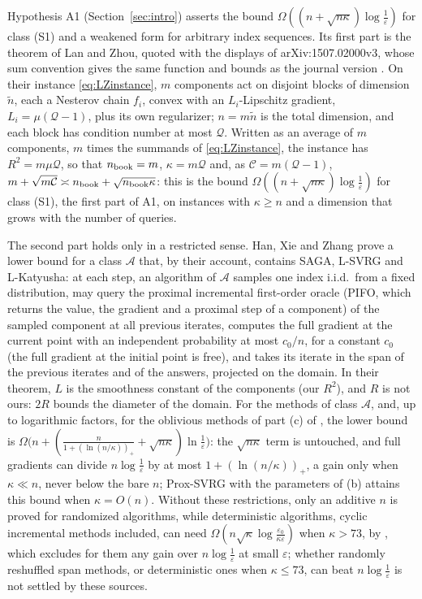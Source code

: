 Hypothesis A1 (Section~\ref{sec:intro}) asserts the bound $\Omega((n+\sqrt{n\kappa})\log\frac1\varepsilon)$ for class
(S1) and a weakened form for arbitrary index sequences. Its first part is the theorem of Lan and Zhou, quoted with the
displays of arXiv:1507.02000v3, whose sum convention gives the same function and bounds as the journal version
\cite{lan2018optimal}. On their instance \eqref{eq:LZinstance}, $m$ components act on disjoint blocks of dimension
$\tilde n$, each a Nesterov chain $f_i$, convex with an $L_i$-Lipschitz gradient, $L_i=\mu(\mathcal Q-1)$, plus its own
regularizer; $n=m\tilde n$ is the total dimension, and each block has condition number at most $\mathcal Q$.
Written as an average of $m$ components, $m$ times the summands of \eqref{eq:LZinstance}, the instance has
$R^2=m\mu\mathcal Q$, so that $n_{\rm book}=m$, $\kappa=m\mathcal Q$ and, as $\mathcal C=m(\mathcal Q-1)$,
$m+\sqrt{m\mathcal C}\asymp n_{\rm book}+\sqrt{n_{\rm book}\kappa}$: this is the bound
$\Omega((n+\sqrt{n\kappa})\log\frac1\varepsilon)$ for class (S1), the first part of A1, on instances with $\kappa\ge n$
and a dimension that grows with the number of queries.

The second part holds only in a restricted sense. Han, Xie and Zhang \cite{han2024lower} prove a lower bound for a
class $\mathcal A$ that, by their account, contains SAGA, L-SVRG and L-Katyusha: at each step, an algorithm of
$\mathcal A$ samples one index i.i.d.\ from a fixed distribution, may query the proximal incremental first-order oracle (PIFO, which returns the
value, the gradient and a proximal step of a component) of the sampled component at all previous iterates, computes
the full gradient at the current point with an independent probability at most $c_0/n$, for a constant $c_0$ (the full
gradient at the initial point is free), and takes its iterate in the span of the previous iterates and of the answers,
projected on the domain. In their theorem, $L$ is the smoothness constant of the components (our $R^2$), and $R$ is not
ours: $2R$ bounds the diameter of the domain.
For the methods of class $\mathcal A$, and, up to logarithmic factors, for the oblivious methods of part (c) of
, the lower bound is
$\Omega\big(n+(\frac{n}{1+(\ln(n/\kappa))_+}+\sqrt{n\kappa})\ln\frac1\varepsilon\big)$: the $\sqrt{n\kappa}$ term is
untouched, and full gradients can divide $n\log\frac1\varepsilon$ by at most $1+(\ln(n/\kappa))_+$, a gain only when
$\kappa\ll n$, never below the bare $n$; Prox-SVRG with the parameters of (b) attains this bound when
$\kappa=O(n)$. Without these restrictions, only an additive $n$ is proved for randomized algorithms, while
deterministic algorithms, cyclic incremental methods included, can need
$\Omega(n\sqrt\kappa\log\frac{\varepsilon_0}{\kappa\varepsilon})$ when $\kappa>73$, by , which excludes
for them any gain over $n\log\frac1\varepsilon$ at small $\varepsilon$; whether randomly reshuffled span methods, or
deterministic ones when $\kappa\le73$, can beat $n\log\frac1\varepsilon$ is not settled by these sources.

